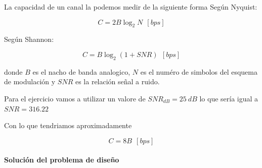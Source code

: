 \documentclass[11pt]{article}
\begin{document}
La capacidad de un canal la podemos medir de la siguiente forma Según
Nyquist:

\[C = 2B\log_2{N}\ \ [bps]\]

Según Shannon:

\[C = B\log_2(1 + SNR)\ \ [bps]\]

donde \(B\) es el nacho de banda analogico, \(N\) es el numéro de
simbolos del esquema de modulación y \(SNR\) es la relación señal a
ruido.

Para el ejercicio vamos a utilizar un valore de \(SNR_{dB} = 25 \ dB\)
lo que sería igual a \(SNR = 316.22\)

Con lo que tendriamos aproximadamente

\[C = 8B \ \ [bps]\]

    \hypertarget{soluciuxf3n-del-problema-de-diseuxf1o}{%
\paragraph{Solución del problema de
diseño}\label{soluciuxf3n-del-problema-de-diseuxf1o}}
\end{document}
